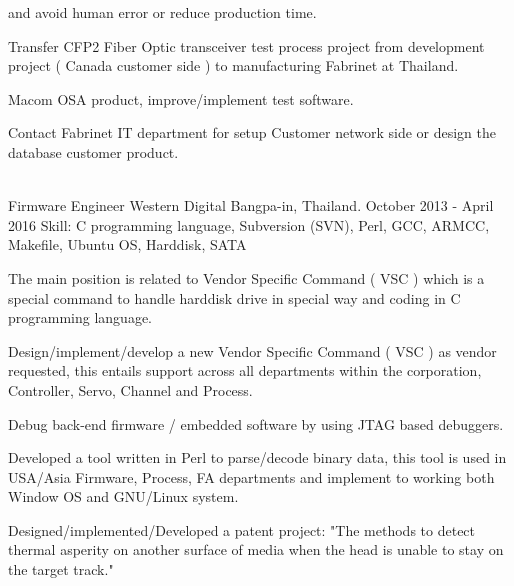 \begin{cventries}
{\begin{cvitems}
{           and avoid human error or reduce production time.}
         \item {Transfer CFP2 Fiber Optic transceiver test process project from development project ( Canada customer
                side ) to manufacturing Fabrinet at Thailand.}
         \item {Macom OSA product, improve/implement test software.}
         \item {Contact Fabrinet IT department for setup Customer network side or
                design the database customer product.}
      \end{cvitems}
    }
\\
  \cventry
    {Firmware Engineer} %
    {Western Digital} %
    {Bangpa-in, Thailand.} %
    {October 2013 - April 2016} %
    {Skill: C programming language, Subversion (SVN), Perl, GCC, ARMCC,
    Makefile, Ubuntu OS, Harddisk, SATA} %
    {
      \begin{cvitems} %
         \item {The main position is related to Vendor Specific Command ( VSC ) which is a special command to handle
          harddisk drive in special way and coding in C programming language.}
         \item {Design/implement/develop a new Vendor Specific Command ( VSC ) as vendor
         requested, this entails support across all departments within the corporation,
         Controller, Servo, Channel and Process.}
         \item {Debug back-end firmware / embedded software by using JTAG based
           debuggers.}
         \item {Developed a tool written in Perl to parse/decode binary data,
         this tool is used in USA/Asia Firmware, Process, FA departments and implement to
         working both Window OS and GNU/Linux system.}
         \item {Designed/implemented/Developed a patent project: "The methods to detect thermal asperity on another
          surface of media when the head is unable to stay on the target track."}
      \end{cvitems}
    }

\end{cventries}
